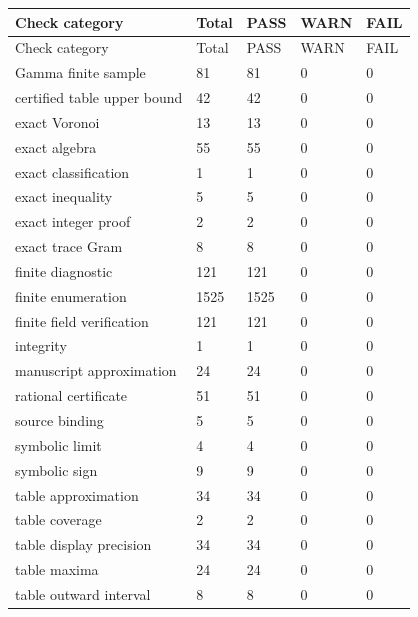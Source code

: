 {\small
\begin{longtable}{@{}p{64mm}p{15mm}p{15mm}p{15mm}p{15mm}@{}}
\toprule
Check category & Total & PASS & WARN & FAIL \\
\midrule\endfirsthead
\toprule
Check category & Total & PASS & WARN & FAIL \\
\midrule\endhead
\bottomrule\endfoot
Gamma finite sample & 81 & 81 & 0 & 0 \\
certified table upper bound & 42 & 42 & 0 & 0 \\
exact Voronoi & 13 & 13 & 0 & 0 \\
exact algebra & 55 & 55 & 0 & 0 \\
exact classification & 1 & 1 & 0 & 0 \\
exact inequality & 5 & 5 & 0 & 0 \\
exact integer proof & 2 & 2 & 0 & 0 \\
exact trace Gram & 8 & 8 & 0 & 0 \\
finite diagnostic & 121 & 121 & 0 & 0 \\
finite enumeration & 1525 & 1525 & 0 & 0 \\
finite field verification & 121 & 121 & 0 & 0 \\
integrity & 1 & 1 & 0 & 0 \\
manuscript approximation & 24 & 24 & 0 & 0 \\
rational certificate & 51 & 51 & 0 & 0 \\
source binding & 5 & 5 & 0 & 0 \\
symbolic limit & 4 & 4 & 0 & 0 \\
symbolic sign & 9 & 9 & 0 & 0 \\
table approximation & 34 & 34 & 0 & 0 \\
table coverage & 2 & 2 & 0 & 0 \\
table display precision & 34 & 34 & 0 & 0 \\
table maxima & 24 & 24 & 0 & 0 \\
table outward interval & 8 & 8 & 0 & 0 \\
\end{longtable}
}
